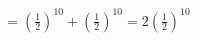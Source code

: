\documentclass[preview]{standalone}
\begin{document}
\begin{align*}
= \left(\frac{1}{2}\right)^{10} + \left(\frac{1}{2}\right)^{10} = 2\left(\frac{1}{2}\right)^{10}
\end{align*}
\end{document}
